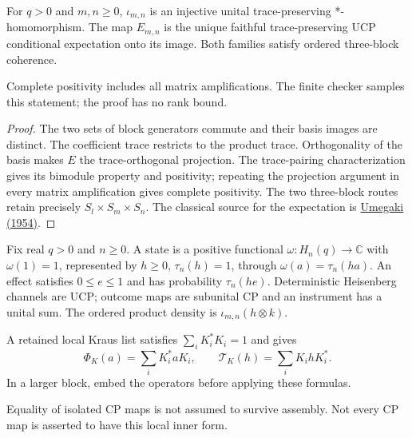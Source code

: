 \begin{theorem}
{\normalfont\statusProved}\quad For $q>0$ and $m,n\geq0$, $\iota_{m,n}$
is an injective unital trace-preserving *-homomorphism. The map $E_{m,n}$
is the unique faithful trace-preserving UCP conditional expectation onto
its image. Both families satisfy ordered three-block coherence.
\end{theorem}
\begin{scope}Complete positivity includes all matrix amplifications.
The finite checker samples this statement; the proof has no rank bound.\end{scope}
\begin{proof}
The two sets of block generators commute and their basis images are
distinct. The coefficient trace restricts to the product trace.
Orthogonality of the basis makes $E$ the trace-orthogonal projection.
The trace-pairing characterization gives its bimodule property and
positivity; repeating the projection argument in every matrix amplification
gives complete positivity. The two three-block routes retain precisely
$S_l\times S_m\times S_n$. The classical source for the expectation is
\href{https://doi.org/10.2748/tmj/1178245177}{Umegaki (1954)}.
\end{proof}

\begin{definition}
Fix real $q>0$ and $n\geq0$. A state is a positive functional $\omega:H_n(q)\to\mathbb C$ with
$\omega(1)=1$, represented by $h\geq0$, $\tau_n(h)=1$, through
$\omega(a)=\tau_n(ha)$. An effect satisfies $0\leq e\leq1$ and has
probability $\tau_n(he)$. Deterministic Heisenberg channels are UCP;
outcome maps are subunital CP and an instrument has a unital sum.
The ordered product density is $\iota_{m,n}(h\otimes k)$.

A retained local Kraus list satisfies $\sum_iK_i^*K_i=1$ and gives
\[
\Phi_K(a)=\sum_iK_i^*aK_i,\qquad
\mathcal T_K(h)=\sum_iK_ihK_i^*.
\]
In a larger block, embed the operators before applying these formulas.
\end{definition}
\begin{scope}Equality of isolated CP maps is not assumed to survive
assembly. Not every CP map is asserted to have this local inner form.\end{scope}

